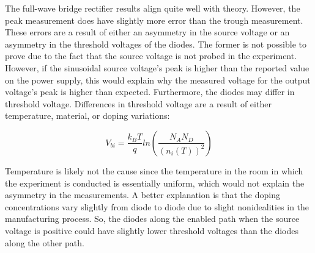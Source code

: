 The full-wave bridge rectifier results align quite well with theory. However, the peak measurement does have slightly more error than the trough measurement. These errors are a result of either an asymmetry in the source voltage or an asymmetry in the threshold voltages of the diodes. The former is not possible to prove due to the fact that the source voltage is not probed in the experiment. However, if the sinusoidal source voltage's peak is higher than the reported value on the power supply, this would explain why the measured voltage for the output voltage's peak is higher than expected. Furthermore, the diodes may differ in threshold voltage. Differences in threshold voltage are a result of either temperature, material, or doping variations:

\begin{equation}
	\label{eq:vbi}
	V_{bi} = \frac{k_BT}{q} ln( \frac{N_AN_D}{(n_{i}(T))^2} )
\end{equation}

Temperature is likely not the cause since the temperature in the room in which the experiment is conducted is essentially uniform, which would not explain the asymmetry in the measurements. A better explanation is that the doping concentrations vary slightly from diode to diode due to slight nonidealities in the manufacturing process. So, the diodes along the enabled path when the source voltage is positive could have slightly lower threshold voltages than the diodes along the other path.

